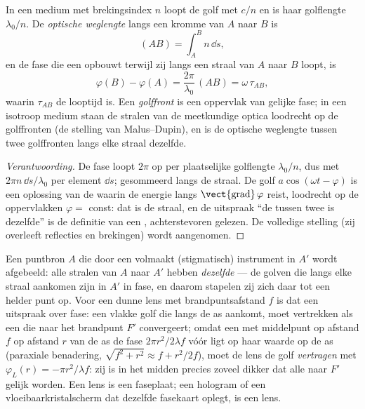 \begin{definition}\label{def:b2:scalar-light-model:path}
In een medium met brekingsindex $n$ loopt de golf met $c/n$ en is haar
golflengte $\lambda_0/n$. De \emph{optische weglengte} langs een kromme van
$A$ naar $B$ is
\[
(AB) = \int_A^Bn\,\dd s ,
\]
en de fase die een  opbouwt terwijl zij langs een
straal van $A$ naar $B$ loopt, is
\[
\varphi(B) - \varphi(A) = \frac{2\pi}{\lambda_0}\,(AB) = \omega\,\tau_{AB} ,
\]
waarin $\tau_{AB}$ de looptijd is. Een \emph{golffront} is een oppervlak van
gelijke fase; in een isotroop medium staan de stralen van de meetkundige
optica loodrecht op de golffronten (de stelling van Malus--Dupin), en is de
optische weglengte tussen twee golffronten langs elke straal dezelfde.
\end{definition}

\begin{proof}[Verantwoording]
De fase loopt $2\pi$ op per plaatselijke golflengte $\lambda_0/n$, dus met
$2\pi n\,\dd s/\lambda_0$ per element $\dd s$; gesommeerd langs de straal.
De golf $a\cos(\omega t - \varphi)$ is een oplossing van de 
waarin de energie langs $\operatorname{\vect{grad}}\varphi$ reist, loodrecht
op de oppervlakken $\varphi = $ const: dat is de straal, en de uitspraak
``de  tussen twee  is dezelfde'' is de
definitie van een , achterstevoren gelezen. De volledige stelling
(zij overleeft reflecties en brekingen) wordt aangenomen.
\end{proof}

\begin{example}\label{ex:b2:scalar-light-model:lens}
Een puntbron $A$ die door een volmaakt (stigmatisch) instrument in $A'$
wordt afgebeeld: alle stralen van $A$ naar $A'$ hebben \emph{dezelfde
} --- de golven die langs elke straal aankomen zijn in
$A'$ in fase, en daarom stapelen zij zich daar tot een helder punt op. Voor
een dunne lens met brandpuntsafstand $f$ is dat een uitspraak over fase: een
vlakke golf die langs de as aankomt, moet vertrekken als een  die
naar het brandpunt $F'$ convergeert; omdat een  met middelpunt op
afstand $f$ op afstand $r$ van de as de fase $2\pi r^2/2\lambda f$ vóór ligt
op haar waarde op de as (paraxiale benadering,
$\sqrt{f^2 + r^2} \approx f + r^2/2f$), moet de lens de golf
\emph{vertragen} met $\varphi_L(r) = -\pi r^2/\lambda f$: zij is in het
midden precies zoveel dikker dat alle  naar $F'$ gelijk
worden. Een lens is een faseplaat; een hologram of een
vloeibaarkristalscherm dat dezelfde fasekaart oplegt, is een lens.
\end{example}

